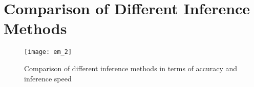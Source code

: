 \documentclass[../statistical_learning_notes.tex]{subfiles}
\begin{document}



\section*{Comparison of Different Inference Methods}
\begin{figure}[h]
\texttt{[image: em\_2]}
\centering
\caption{Comparison of different inference methods in terms of accuracy and inference speed}
\label{fig:em_2} %
\end{figure}





\end{document}
